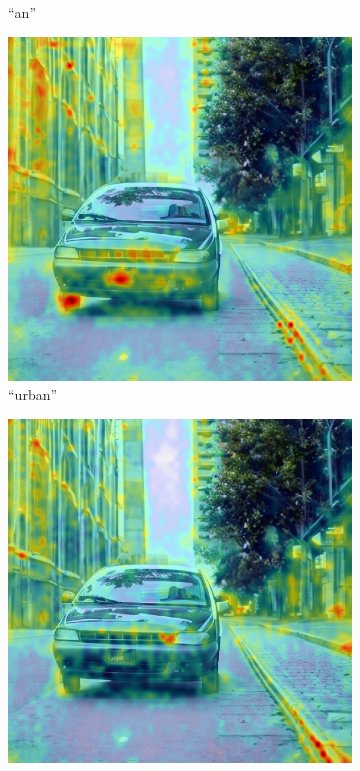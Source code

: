 \begin{figure}
\begin{subfigure}{0.32\columnwidth}
   \caption{``an''}
   \label{fig:daam-example-image-5}
  \end{subfigure}
  \par\bigskip
  \begin{subfigure}{0.32\columnwidth}
   \includegraphics[width=\columnwidth]{img/3-methodology/example_daam_heatmap_urban.png}
   \caption{``urban''}
   \label{fig:daam-example-image-6}
  \end{subfigure}
  \begin{subfigure}{0.32\columnwidth}
   \includegraphics[width=\columnwidth]{img/3-methodology/example_daam_heatmap_environment.png}

\end{subfigure}
\end{figure}
